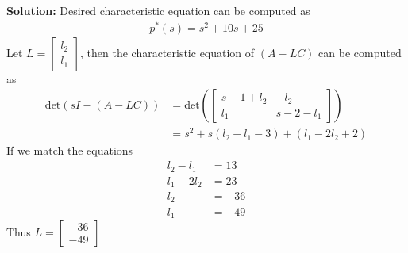 \documentclass[twoside]{article}
\begin{document}
\textbf{Solution:} Desired characteristic equation can be computed as
%
\begin{align*}
  p^*(s) = s^2 + 10 s + 25
\end{align*}
%
Let $L = \left[ \begin{array}{c} l_2 \\ l_1 \end{array} \right]$, then
the characteristic equation of $(A - L C)$ can be computed as
%
\begin{align*}
  \mathrm{det} \left( s I - ( A - L C ) \right) &= 
  \mathrm{det} \left(
  \left[ \begin{array}{cc} s - 1 + l_2 & -l_2 \\ l_1 & s - 2 - l_1 \end{array} \right]
  \right)
\\
&= s^2 + s (l_2 - l_1 - 3) + (l_1 - 2 l_2 + 2)
\end{align*}
%
If we match the equations
%
\begin{align*}
  l_2 - l_1 &= 13
\\
  l_1 - 2 l_2 &= 23
\\
 l_2 &= -36
\\
 l_1 &= -49
\end{align*}
%
Thus $L = \left[ \begin{array}{c} -36 \\ -49 \end{array} \right]$




\end{document}
